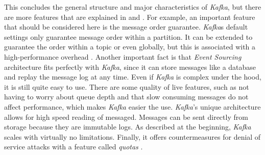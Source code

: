 This concludes the general structure and major characteristics of \textit{Kafka}, but there are more features that are explained in \cite{Stopford.2018} and \cite{Kumar.2017}.
For example, an important feature that should be considered here is the message order guarantee.
\textit{Kafka}s default settings only guarantee message order within a partition.
It can be extended to guarantee the order within a topic or even globally, but this is associated with a high-performance overhead \cite[p.~30]{Kumar.2017}.
Another important fact is that \textit{Event Sourcing} architecture fits perfectly with \textit{Kafka}, since it can store messages like a database and replay the message log at any time.
Even if \textit{Kafka} is complex under the hood, it is still quite easy to use.
There are some quality of live features, such as not having to worry about queue depth and that slow consuming messages do not affect performance, which makes \textit{Kafka} easier the use.
\textit{Kafka}'s unique architecture allows for high speed reading of messaged.
Messages can be sent directly from storage because they are immutable logs.
As described at the beginning, \textit{Kafka} scales with virtually no limitations.
Finally, it offers countermeasures for denial of service attacks with a feature called \textit{quotas} \cite[p.~18ff.]{Stopford.2018}.
